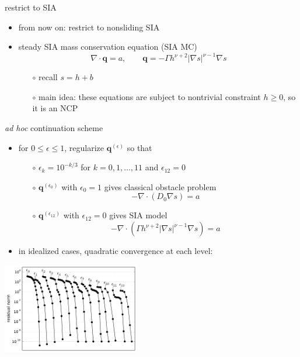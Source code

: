 \documentclass[xcolor={dvipsnames}]{beamer}
\newcommand\bq{\mathbf{q}}
\newcommand\Div{\nabla\cdot}
\newcommand\eps{\epsilon}
\newcommand\grad{\nabla}
\begin{document}
\begin{frame}{restrict to SIA}

\begin{itemize}
\item from now on: restrict to nonsliding SIA
\item steady SIA mass conservation equation (SIA MC)
    $$\Div \bq = a, \qquad \bq = - \Gamma h^{\nu+2} |\grad s|^{\nu-1} \grad s$$

\vspace{-2mm}
    \begin{itemize}
    \item[$\circ$] recall $s=h+b$
    \item[$\circ$] main idea: these equations are subject to nontrivial constraint $h\ge 0$, so it is an NCP
    \end{itemize}
\end{itemize}
\end{frame}


\begin{frame}{\emph{ad hoc} continuation scheme}

\begin{itemize}
\item for $0 \le \eps \le 1$, regularize $\bq^{(\eps)}$ so that
  \begin{itemize}
  \item[$\circ$] $\eps_k = 10^{-k/3}$ for $k=0,1,\dots,11$ and $\eps_{12}=0$
  \item[$\circ$] $\bq^{(\eps_0)}$ with $\eps_0=1$ gives classical obstacle problem
    $$- \Div (D_0 \grad s) = a$$
  \item[$\circ$] $\bq^{(\eps_{12})}$ with $\eps_{12}=0$ gives SIA model
    $$- \Div (\Gamma h^{\nu+2} |\grad s|^{\nu-1} \grad s) = a$$
  \end{itemize}
\item in idealized cases, quadratic convergence at each level:
\end{itemize}

\begin{center}
\includegraphics[width=0.45\textwidth,keepaspectratio=true]{newtonconv}
\end{center}
\end{frame}
\end{document}
